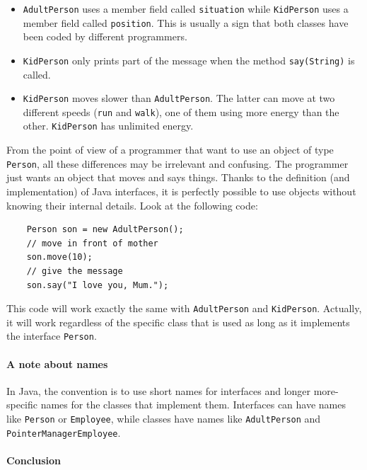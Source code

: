 \begin{itemize}
\item \verb+AdultPerson+ uses a member field called \verb+situation+
  while \verb+KidPerson+ uses a member field called
  \verb+position+. This is usually a sign that both classes have been
  coded by different programmers.
\item \verb+KidPerson+ only prints part of the message when the method
  \verb+say(String)+ is called.
\item \verb+KidPerson+ moves slower than \verb+AdultPerson+. The
  latter can move at two different speeds (\verb+run+ and
  \verb+walk+), one of them using more 
  energy than the other. \verb+KidPerson+ has unlimited energy. 
\end{itemize}

From the point of view of a programmer that want to use an object of
type \verb+Person+, all these differences may be irrelevant and
confusing. The programmer just wants an object that moves and says
things. Thanks to the definition (and implementation) 
of Java interfaces, it is perfectly possible to use
objects without knowing their internal details.
Look at the following code: 

\begin{verbatim}
    Person son = new AdultPerson();
    // move in front of mother
    son.move(10);
    // give the message
    son.say("I love you, Mum.");
\end{verbatim}

This code will work exactly the same with \verb+AdultPerson+ and
\verb+KidPerson+. Actually, it will work regardless of the specific class
that is used as long as it
implements the interface \verb+Person+. 

\paragraph{A note about names}
\label{sec:note-about-names}

In Java, the convention is to use short names for interfaces and
longer more-specific names for the classes that implement
them. Interfaces can have names like \verb+Person+ or \verb+Employee+,
while classes have names like \verb+AdultPerson+ and
\verb+PointerManagerEmployee+. 

\paragraph{Conclusion}
\label{sec:conclusion-1}

